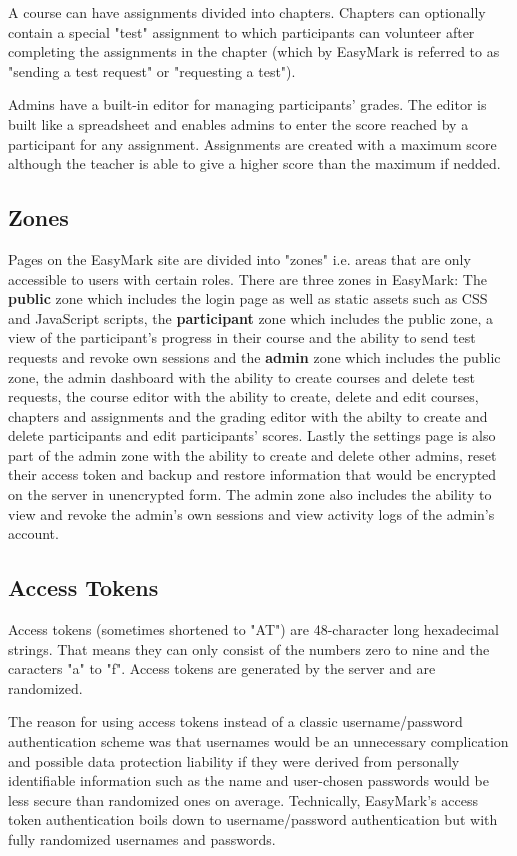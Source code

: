 \documentclass[12pt,a4paper,oneside]{report}
\begin{document}
	\pagebreak
	A course can have assignments divided into chapters. Chapters can optionally contain a special "test" assignment to which participants can volunteer after completing the assignments in the chapter (which by EasyMark is referred to as "sending a test request" or "requesting a test").

	Admins have a built-in editor for managing participants' grades. The editor is built like a spreadsheet and enables admins to enter the score reached by a participant for any assignment. Assignments are created with a maximum score although the teacher is able to give a higher score than the maximum if nedded.

	\subsection{Zones}
	Pages on the EasyMark site are divided into "zones" i.e. areas that are only accessible to users with certain roles. There are three zones in EasyMark: The \textbf{public} zone which includes the login page as well as static assets such as CSS and JavaScript scripts, the \textbf{participant} zone which includes the public zone, a view of the participant's progress in their course and the ability to send test requests and revoke own sessions and the \textbf{admin} zone which includes the public zone, the admin dashboard with the ability to create courses and delete test requests, the course editor with the ability to create, delete and edit courses, chapters and assignments and the grading editor with the abilty to create and delete participants and edit participants' scores. Lastly the settings page is also part of the admin zone with the ability to create and delete other admins, reset their access token and backup and restore information that would be encrypted on the server in unencrypted form. The admin zone also includes the ability to view and revoke the admin's own sessions and view activity logs of the admin's account.

	\subsection{Access Tokens} \label{subsec:accesstokens}
	Access tokens (sometimes shortened to "AT") are 48-character long hexadecimal strings. That means they can only consist of the numbers zero to nine and the caracters "a" to "f". Access tokens are generated by the server and are randomized.

	The reason for using access tokens instead of a classic username/password authentication scheme was that usernames would be an unnecessary complication and possible data protection liability if they were derived from personally identifiable information such as the name and user-chosen passwords would be less secure than randomized ones on average. Technically, EasyMark's access token authentication boils down to username/password authentication but with fully randomized usernames and passwords.
\end{document}

